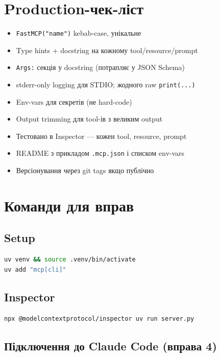 \documentclass[11pt,a4paper]{article}
\begin{document}
\section{Production-чек-ліст}

\begin{itemize}[leftmargin=2em]
\item[$\square$] \texttt{FastMCP("name")} kebab-case, унікальне
\item[$\square$] Type hints + docstring на кожному tool/resource/prompt
\item[$\square$] \texttt{Args:} секція у docstring (потрапляє у JSON Schema)
\item[$\square$] stderr-only logging для STDIO; жодного raw \texttt{print(...)}
\item[$\square$] Env-vars для секретів (не hard-code)
\item[$\square$] Output trimming для tool-ів з великим output
\item[$\square$] Тестовано в Inspector --- кожен tool, resource, prompt
\item[$\square$] README з прикладом \texttt{.mcp.json} і списком env-vars
\item[$\square$] Версіонування через git tags якщо публічно
\end{itemize}

\section{Команди для вправ}

\subsection{Setup}

\begin{lstlisting}[language=bash]
uv venv && source .venv/bin/activate
uv add "mcp[cli]"
\end{lstlisting}

\subsection{Inspector}

\begin{lstlisting}[language=bash]
npx @modelcontextprotocol/inspector uv run server.py
\end{lstlisting}

\subsection{Підключення до Claude Code (вправа 4)}
\end{document}

